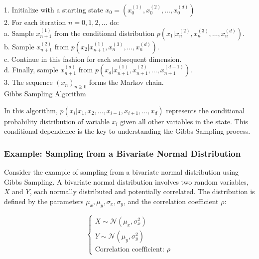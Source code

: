 \documentclass{report}
\begin{document}
\begin{center}
	\begin{minipage}{0.7\linewidth}
		\begin{algorithm}[H]
			1. Initialize with a starting state $x_0 = (x_0^{(1)}, x_0^{(2)}, \dots, x_0^{(d)})$ \\
			2. For each iteration $n = 0, 1, 2, \dots$ do: \\
			\hspace*{0.5cm} a. Sample $x_{n+1}^{(1)}$ from the conditional distribution $p(x_1 | x_n^{(2)}, x_n^{(3)}, \dots, x_n^{(d)})$. \\
			\hspace*{0.5cm} b. Sample $x_{n+1}^{(2)}$ from $p(x_2 | x_{n+1}^{(1)}, x_n^{(3)}, \dots, x_n^{(d)})$. \\
			\hspace*{0.5cm} c. Continue in this fashion for each subsequent dimension. \\
			\hspace*{0.5cm} d. Finally, sample $x_{n+1}^{(d)}$ from $p(x_d | x_{n+1}^{(1)}, x_{n+1}^{(2)}, \dots, x_{n+1}^{(d-1)})$. \\
			3. The sequence $(x_n)_{n \geq 0}$ forms the Markov chain. \\
			\caption{Gibbs Sampling Algorithm}
			\label{alg:Gibbs-Sampling}
		\end{algorithm}
	\end{minipage}
\end{center}

In this algorithm, $p(x_i | x_1, x_2, \dots, x_{i-1}, x_{i+1}, \dots, x_d)$ represents the conditional probability distribution of variable $x_i$ given all other variables in the state. This conditional dependence is the key to understanding the Gibbs Sampling process.

\subsubsection{Example: Sampling from a Bivariate Normal Distribution}
\label{sec:bivariate_normal_sampling}

Consider the example of sampling from a bivariate normal distribution using Gibbs Sampling. A bivariate normal distribution involves two random variables, $X$ and $Y$, each normally distributed and potentially correlated. The distribution is defined by the parameters $\mu_x, \mu_y, \sigma_x, \sigma_y$, and the correlation coefficient $\rho$:

\[
	\begin{cases}
		X \sim \mathcal{N}(\mu_x, \sigma_x^2) \\
		Y \sim \mathcal{N}(\mu_y, \sigma_y^2) \\
		\text{Correlation coefficient: } \rho
	\end{cases}
\]
\end{document}

